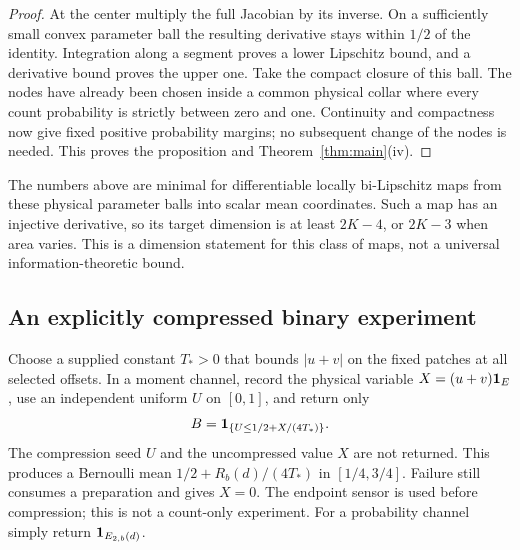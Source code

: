 \begin{proof}
At the center multiply the full Jacobian by its inverse. On a sufficiently
small convex parameter ball the resulting derivative stays within
$1/2$ of the identity. Integration along a segment proves a lower
Lipschitz bound, and a derivative bound proves the upper one.
Take the compact closure of this ball. The nodes have already been
chosen inside a common physical collar where every count probability
is strictly between zero and one. Continuity and compactness now give
fixed positive probability margins; no subsequent change of the nodes
is needed. This proves the proposition and Theorem~\ref{thm:main}(iv).
\end{proof}

The numbers above are minimal for differentiable locally bi-Lipschitz
maps from these physical parameter balls into scalar mean coordinates.
Such a map has an injective derivative, so its target dimension is at
least $2K-4$, or $2K-3$ when area varies. This is a dimension statement
for this class of maps, not a universal information-theoretic bound.

\subsection{An explicitly compressed binary experiment}
Choose a supplied constant $T_*>0$ that bounds $|u+v|$ on the fixed
patches at all selected offsets. In a moment channel, record the physical
variable $X=(u+v)\mathbf 1_E$, use an independent uniform $U$ on $[0,1]$,
and return only
\begin{equation}\label{eq:binary}
 B=\mathbf 1_{\{U\le1/2+X/(4T_*)\}}.
\end{equation}
The compression seed $U$ and the uncompressed value $X$ are not returned.
This produces a Bernoulli mean $1/2+R_b(d)/(4T_*)$ in
$[1/4,3/4]$. Failure still consumes a preparation and gives $X=0$.
The endpoint sensor is used before compression; this is not a
count-only experiment. For a probability channel simply return
$\mathbf 1_{E_{2,b}(d)}$.

